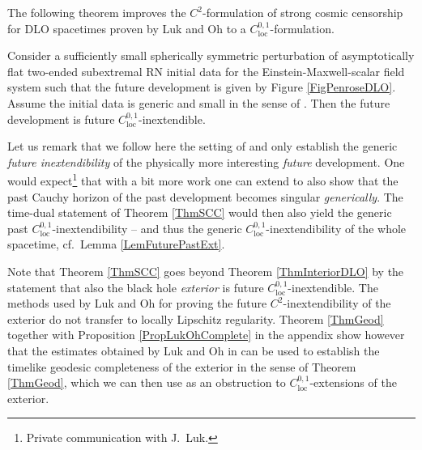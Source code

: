 \documentclass[reqno]{article}
\newcommand{\loc}{\mathrm{loc}}
\begin{document}
The following theorem improves the $C^2$-formulation of strong cosmic censorship for DLO spacetimes proven by Luk and Oh to a $C^{0,1}_{\loc}$-formulation.


\begin{theorem} \label{ThmSCC}
Consider a sufficiently small spherically symmetric perturbation of asymptotically flat two-ended subextremal RN initial data for the Einstein-Maxwell-scalar field system such that the future development is given by Figure \ref{FigPenroseDLO}. Assume the initial data is generic and small in the sense of \cite{LukOh19II}. Then the future development is future $C^{0,1}_{\loc}$-inextendible.
\end{theorem}

Let us remark that we follow here the setting of \cite{LukOh19II} and only establish the generic \emph{future inextendibility} of the physically more interesting \emph{future} development. One would expect\footnote{Private communication with J.\ Luk.} that with a bit more work one can extend \cite{LukOh19II} to also show that the past Cauchy horizon of the past development becomes singular \emph{generically}. The time-dual statement of Theorem \ref{ThmSCC} would then also yield the generic past $C^{0,1}_{\loc}$-inextendibility -- and thus the generic $C^{0,1}_{\loc}$-inextendibility of the whole spacetime, cf.\ Lemma \ref{LemFuturePastExt}.


Note that Theorem \ref{ThmSCC} goes beyond  Theorem \ref{ThmInteriorDLO} by the statement that also the black hole \emph{exterior} is future $C^{0,1}_{\loc}$-inextendible. The methods used by Luk and Oh for proving the future $C^2$-inextendibility of the exterior do not transfer to locally Lipschitz regularity. Theorem \ref{ThmGeod} together with Proposition \ref{PropLukOhComplete} in the appendix show however that the estimates obtained by Luk and Oh in \cite{LukOh19II} can be used to establish the timelike geodesic completeness of the exterior in the sense of Theorem \ref{ThmGeod}, which we can then use as an obstruction to $C^{0,1}_{\loc}$-extensions of the exterior.
\end{document}
